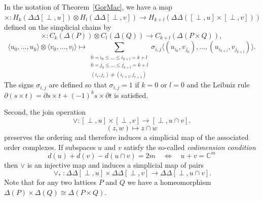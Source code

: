 \documentclass[a4paper,12pt]{amsart}
\newcommand{\DD}{\Delta\!\!\!\Delta}
\newcommand{\CC}{\mathbb C}
\renewcommand{\le}{\leqslant}
\theoremstyle{definition}
\theoremstyle{remark}
\numberwithin{equation}{section}
\begin{document}
In the notation of Theorem~\ref{GorMac}, we have a map
$\times : H_k(\DD[\perp, u]) \otimes H_l(\DD[\perp, v]) \to H_{k+l}(\DD([\perp, u] \times [\perp, v]) )$ 
defined on the simplicial chains by
$$\times : C_k(\Delta(P)) \otimes C_l(\Delta(Q)) \to C_{k+l}(\Delta(P \times Q)),$$
$$\langle u_0, \dots, u_k \rangle \otimes \langle v_0, \dots, v_l \rangle
\mapsto \sum_{ \substack{
	0 = i_0 \le \dots \le i_{k+l} = k+l \\
	0 = j_0 \le \dots \le j_{k+l} = k+l \\
	(i_r, j_r) \neq (i_{r+1}, j_{r+1}) } }
\sigma_{i, j} \langle (u_{i_0}, v_{j_0}), \dots, (u_{i_{k+l}}, v_{j_{k+l}}) \rangle.
$$
The signs $\sigma_{i, j}$ are defined so that $\sigma_{i, j} = 1$ if $k = 0$ or $l = 0$ 
and the Leibniz rule $\partial(s \times t) = \partial s \times t + (-1)^k s \times \partial t$ is satisfied.

Second, the join operation
$$\vee: [\perp, u] \times [\perp, v] \to [\perp, u \cap v].$$
$$(z, w) \mapsto z \cap w $$
preserves the ordering and therefore induces a simplicial map of the associated order complexes.
If subspaces $u$ and $v$ satisfy the so-called \textit{codimension condition}
$$d(u) + d(v) - d(u \cap v) = 2m \quad \Leftrightarrow \quad u + v = \CC^m$$
then $\vee$ is an injective map and induces a simplicial map of pairs
$$ \vee_*: \DD[\perp, u] \times \DD[\perp, v] \to \DD[\perp, u \cap v].$$
Note that for any two lattices $P$ and $Q$ we have a homeomorphism $\Delta(P) \times \Delta(Q) \cong \Delta(P \times Q)$.
\end{document}
